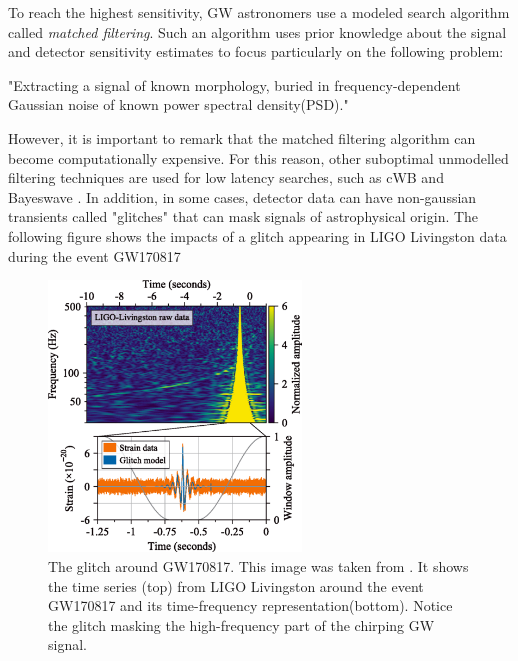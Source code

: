 To reach the highest sensitivity, GW astronomers use a modeled search algorithm called \textit{matched filtering}. Such an algorithm uses prior knowledge about the signal and detector sensitivity estimates to focus particularly on the following problem:

"Extracting a signal of known morphology, buried in frequency-dependent Gaussian noise of known power spectral density(PSD)."

However, it is important to remark that the matched filtering algorithm can become computationally expensive. For this reason, other suboptimal unmodelled filtering techniques are used for low latency searches, such as cWB and Bayeswave \cite{Drago:2020kic, Cornish:2014kda}. In addition, in some cases, detector data can have non-gaussian transients called "glitches" that can mask signals of astrophysical origin. The following figure shows the impacts of a glitch appearing in LIGO Livingston data during the event GW170817
 

\begin{figure}[hbt!]
\begin{center}
\includegraphics[width=0.6\textwidth, angle=0]{images/170817.png}
\captionsetup{width=0.8\textwidth}
\caption[The glitch around GW170817]{The glitch around GW170817. This image was taken from \cite{LIGOScientific:2017vwq}. It shows the time series (top) from LIGO Livingston around the event GW170817 and its time-frequency representation(bottom). Notice the glitch masking the high-frequency part of the chirping GW signal.}
\label{ijenfo}
\end{center}
\end{figure}

\FloatBarrier

